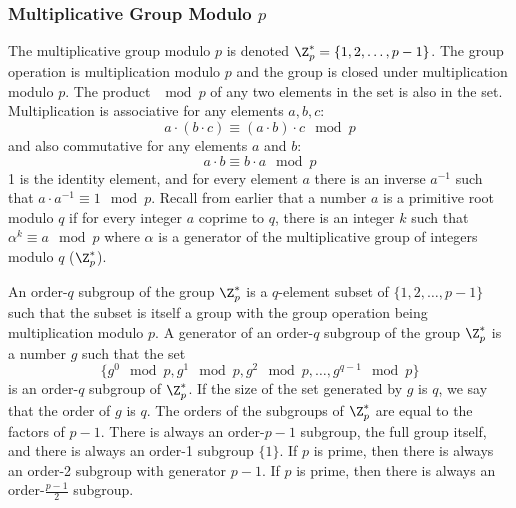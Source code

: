 \documentclass{math}
\begin{document}
\subsubsection*{Multiplicative Group Modulo \( p \)}
The multiplicative group modulo \( p \) is denoted \( \Z_p^{*} =
\{1,2,\dots,p-1 \} \). The group operation is multiplication modulo \( p \) and
the group is closed under multiplication modulo \( p \). The product
\( \mod p \) of any two elements in the set is also in the set. Multiplication
is associative for any elements \( a,b,c \):
\[ a\cdot(b\cdot c) \equiv (a\cdot b)\cdot c\mod p \]
and also commutative for any elements \( a \) and \( b \):
\[ a\cdot b \equiv b\cdot a\mod p \]
1 is the identity element, and for every element \( a \) there is an inverse
\( a^{-1} \) such that \( a\cdot a^{-1}\equiv 1\mod p \). Recall from earlier
that a number \( a \) is a primitive root modulo \( q \) if for every integer
\( a \) coprime to \( q \), there is an integer \( k \) such that
\( \alpha^k\equiv a\mod p \) where \( \alpha \) is a generator of the
multiplicative group of integers modulo \( q \) (\( \Z_{p}^{*} \)).
\par An order-\( q \) subgroup of the group \( \Z_p^{*} \) is a \( q \)-element
subset of \( \{1,2,\dots,p-1\} \) such that the subset is itself a group with
the group operation being multiplication modulo \( p \). A generator of an
order-\( q \) subgroup of the group \( \Z_p^{*} \) is a number \( g \) such that
the set
\[ \{g^0\mod p, g^1\mod p,g^2\mod p,\dots,g^{q-1}\mod p\} \]
is an order-\( q \) subgroup of \( \Z_p^{*} \). If the size of the set generated
by \( g \) is \( q \), we say that the order of \( g \) is \( q \). The orders
of the subgroups of \( \Z_p^{*} \) are equal to the factors of \( p-1 \). There
is always an order-\( p-1 \) subgroup, the full group itself, and there is
always an order-1 subgroup \( \{1\} \). If \( p \) is prime, then there is
always an order-2 subgroup with generator \( p-1 \). If \( p \) is prime, then
there is always an order-\( \frac{p-1}{2} \) subgroup.
\end{document}
